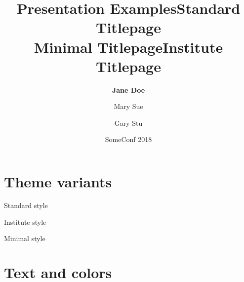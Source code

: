 \documentclass[table,aspectratio=43]{beamer}
\title[]{Presentation Examples}
\author[Jane Doe]{\textbf{Jane Doe} \and Mary Sue \and Gary Stu}
\date{SomeConf 2018}
\institute{IAIK}
\begin{document}
  \begin{frame}[plain]
    \maketitle
  \end{frame}

  \begin{frame}
    \tableofcontents
  \end{frame}

  \section{Theme variants}

  \switchtostandard
  \title[]{Standard Titlepage\\Minimal Titlepage}
  \begin{frame}[plain]
    \maketitle
  \end{frame}

  \switchtoinstitute
  \title[]{Institute Titlepage}
  \begin{frame}[plain]
    \maketitle
  \end{frame}

  \switchtostandard
  \begin{frame}{Standard style}
  \end{frame}
  \switchtoinstitute
  \begin{frame}{Institute style}
  \end{frame}
  \switchtominimal
  \begin{frame}{Minimal style}
  \end{frame}
  \switchtostandard

  \section{Text and colors}
\end{document}
